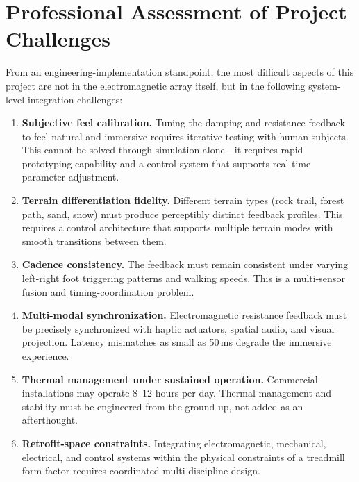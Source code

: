\documentclass[a4paper,11pt]{article}
\begin{document}
\section{Professional Assessment of Project Challenges}

From an engineering-implementation standpoint, the most difficult aspects of this project are not in the electromagnetic array itself, but in the following system-level integration challenges:

\begin{enumerate}
  \item \textbf{Subjective feel calibration.} Tuning the damping and resistance feedback to feel natural and immersive requires iterative testing with human subjects. This cannot be solved through simulation alone---it requires rapid prototyping capability and a control system that supports real-time parameter adjustment.

  \item \textbf{Terrain differentiation fidelity.} Different terrain types (rock trail, forest path, sand, snow) must produce perceptibly distinct feedback profiles. This requires a control architecture that supports multiple terrain modes with smooth transitions between them.

  \item \textbf{Cadence consistency.} The feedback must remain consistent under varying left-right foot triggering patterns and walking speeds. This is a multi-sensor fusion and timing-coordination problem.

  \item \textbf{Multi-modal synchronization.} Electromagnetic resistance feedback must be precisely synchronized with haptic actuators, spatial audio, and visual projection. Latency mismatches as small as 50\,ms degrade the immersive experience.

  \item \textbf{Thermal management under sustained operation.} Commercial installations may operate 8--12 hours per day. Thermal management and stability must be engineered from the ground up, not added as an afterthought.

  \item \textbf{Retrofit-space constraints.} Integrating electromagnetic, mechanical, electrical, and control systems within the physical constraints of a treadmill form factor requires coordinated multi-discipline design.
\end{enumerate}

\vspace{0.5em}
\end{document}
